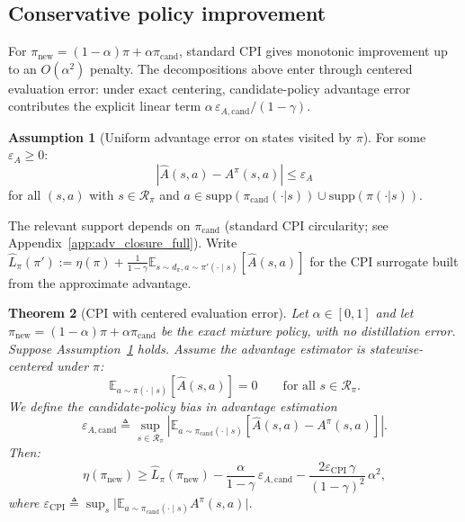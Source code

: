 \documentclass{article}
\theoremstyle{plain}
\newtheorem{theorem}{Theorem}[section]
\theoremstyle{definition}
\newtheorem{assumption}[theorem]{Assumption}
\theoremstyle{remark}
\newcommand{\E}{\mathbb{E}}
\begin{document}
\subsection{Conservative policy improvement}
\label{sec:cpi}

For $\pi_{\mathrm{new}}=(1-\alpha)\pi+\alpha\pi_{\mathrm{cand}}$, standard CPI gives monotonic improvement up to an $O(\alpha^2)$ penalty. The decompositions above enter through centered evaluation error: under exact centering, candidate-policy advantage error contributes the explicit linear term $\alpha\,\varepsilon_{A,\mathrm{cand}}/(1-\gamma)$.
\begin{assumption}[Uniform advantage error on states visited by $\pi$]
\label{ass:Ahat_error_bound}
For some $\varepsilon_A\ge 0$:
\begin{equation}
|\widehat{A}(s,a) - A^\pi(s,a)| \le \varepsilon_A
\end{equation}
for all $(s,a)$ with $s \in \mathcal{R}_{\pi}$ and
$a \in \mathrm{supp}(\pi_{\mathrm{cand}}(\cdot|s)) \cup \mathrm{supp}(\pi(\cdot|s))$.
\end{assumption}

The relevant support depends on $\pi_{\mathrm{cand}}$ (standard CPI circularity; see Appendix~\ref{app:adv_closure_full}).
Write $\widehat{L}_\pi(\pi') := \eta(\pi) + \frac{1}{1-\gamma}\E_{s\sim d_\pi, a\sim\pi'(\cdot\mid s)}[\widehat{A}(s,a)]$ for the CPI surrogate built from the approximate advantage.

\begin{theorem}[CPI with centered evaluation error]
\label{thm:monotone_with_error}
Let $\alpha\in[0,1]$ and let $\pi_{\mathrm{new}}=(1-\alpha)\pi+\alpha\pi_{\mathrm{cand}}$ be the exact mixture policy, with no distillation error. Suppose Assumption~\ref{ass:Ahat_error_bound} holds.
Assume the advantage estimator is statewise-centered under $\pi$:
\begin{equation}
\E_{a\sim\pi(\cdot\mid s)}[\widehat A(s,a)] = 0
\qquad\text{for all } s\in\mathcal{R}_\pi.
\label{eq:centering_condition}
\end{equation}
We define the candidate-policy bias in advantage estimation
\begin{equation}
\varepsilon_{A,\mathrm{cand}}
\triangleq
\sup_{s \in \mathcal{R}_{\pi}}
\left|
\E_{a\sim\pi_{\mathrm{cand}}(\cdot\mid s)}\!\left[\widehat{A}(s,a)-A^\pi(s,a)\right]
\right|.
\label{eq:epsA0_def}
\end{equation}
Then:
\begin{equation}
\eta(\pi_{\mathrm{new}})
\ge
\widehat{L}_\pi(\pi_{\mathrm{new}})
-
\frac{\alpha}{1-\gamma}\,\varepsilon_{A,\mathrm{cand}}
-
\frac{2\varepsilon_{\mathrm{CPI}}\,\gamma}{(1-\gamma)^2}\,\alpha^2,
\label{eq:main_theorem}
\end{equation}
where $\varepsilon_{\mathrm{CPI}} \triangleq \sup_s\bigl|\E_{a\sim\pi_{\mathrm{cand}}(\cdot\mid s)}A^\pi(s,a)\bigr|$.
\end{theorem}
\end{document}
